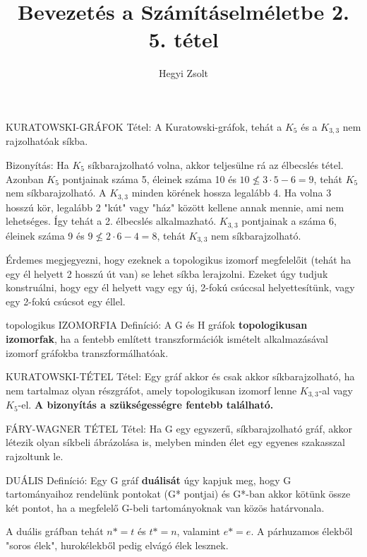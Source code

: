 \documentclass[]{article}
\title{Bevezetés a Számításelméletbe 2.\\{\large 5. tétel}}
\author{Hegyi Zsolt}
\begin{document}
\maketitle
\begin{framed}
KURATOWSKI-GRÁFOK Tétel: A Kuratowski-gráfok, tehát a $K_5$ és a $K_{3,3}$ nem rajzolhatóak síkba.
\end{framed}
\begin{leftbar}
Bizonyítás: Ha $K_5$ síkbarajzolható volna, akkor teljesülne rá az élbecslés tétel. Azonban $K_5$ pontjainak száma 5, éleinek száma 10 és $10 \not\leq 3 \cdot 5 -6 = 9$, tehát $K_5$ nem síkbarajzolható.
A $K_{3,3}$ minden körének hossza legalább 4. Ha volna 3 hosszú kör, legalább 2 "kút" vagy "ház" között kellene annak mennie, ami nem lehetséges. Így tehát a 2. élbecslés alkalmazható. $K_{3,3}$ pontjainak a száma 6, éleinek száma 9 és $9 \not\leq 2 \cdot 6 - 4 = 8$, tehát $K_{3,3}$ nem síkbarajzolható.
\end{leftbar}
Érdemes megjegyezni, hogy ezeknek a topologikus izomorf megfelelőit (tehát ha egy él helyett 2 hosszú út van) se lehet síkba lerajzolni. Ezeket úgy tudjuk konstruálni, hogy egy él helyett vagy egy új, 2-fokú csúccsal helyettesítünk, vagy egy 2-fokú csúcsot egy éllel.
\begin{shaded}
topologikus IZOMORFIA Definíció: A G és H gráfok \textbf{topologikusan izomorfak}, ha a fentebb említett transzformációk ismételt alkalmazásával izomorf gráfokba transzformálhatóak.
\end{shaded}
\begin{framed}
KURATOWSKI-TÉTEL Tétel: Egy gráf akkor és csak akkor síkbarajzolható, ha nem tartalmaz olyan részgráfot, amely topologikusan izomorf lenne $K_{3,3}$-al vagy $K_5$-el. \textbf{A bizonyítás a szükségességre fentebb található.}
\end{framed}
\begin{framed}
FÁRY-WAGNER TÉTEL Tétel: Ha G egy egyszerű, síkbarajzolható gráf, akkor létezik olyan síkbeli ábrázolása is, melyben minden élet egy egyenes szakasszal rajzoltunk le.
\end{framed}
\begin{shaded}
DUÁLIS Definíció: Egy G gráf \textbf{duálisát} úgy kapjuk meg, hogy G tartományaihoz rendelünk pontokat (G* pontjai) és G*-ban akkor kötünk össze két pontot, ha a megfelelő G-beli tartományoknak van közös határvonala.
\end{shaded}
A duális gráfban tehát $n* = t$ és $t* = n$, valamint $e* = e$.
A párhuzamos élekből "soros élek", hurokélekből pedig elvágó élek lesznek.
\end{document}
